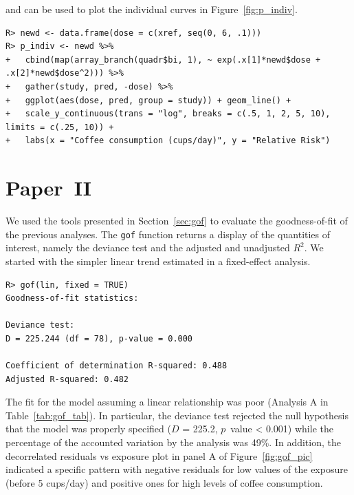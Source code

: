 \documentclass[11pt,a4paper,twoside,openany]{book}\usepackage{knitr}
\begin{document}
{\noindent and can be used to plot the individual curves in Figure~\ref{fig:p_indiv}.
\begin{knitrout}\footnotesize
{}\color{fgcolor}\begin{kframe}
\begin{verbatim}
R> newd <- data.frame(dose = c(xref, seq(0, 6, .1)))
R> p_indiv <- newd %>%
+   cbind(map(array_branch(quadr$bi, 1), ~ exp(.x[1]*newd$dose + .x[2]*newd$dose^2))) %>%
+   gather(study, pred, -dose) %>%
+   ggplot(aes(dose, pred, group = study)) + geom_line() +
+   scale_y_continuous(trans = "log", breaks = c(.5, 1, 2, 5, 10), limits = c(.25, 10)) +
+   labs(x = "Coffee consumption (cups/day)", y = "Relative Risk")
\end{verbatim}
\end{kframe}
\end{knitrout}


\section{Paper~II}\label{sec:res_paperII}



We used the tools presented in Section~\ref{sec:gof} to evaluate the goodness-of-fit of the previous analyses. The \texttt{gof} function returns a display of the quantities of interest, namely the deviance test and the adjusted and unadjusted $R^2$. 
We started with the simpler linear trend estimated in a fixed-effect analysis.
\begin{knitrout}\footnotesize
{}\color{fgcolor}\begin{kframe}
\begin{verbatim}
R> gof(lin, fixed = TRUE)
Goodness-of-fit statistics:

Deviance test: 
D = 225.244 (df = 78), p-value = 0.000

Coefficient of determination R-squared: 0.488 
Adjusted R-squared: 0.482
\end{verbatim}
\end{kframe}
\end{knitrout}

\noindent The fit for the model assuming a linear relationship was poor (Analysis A in Table~\ref{tab:gof_tab}). In particular, the deviance test rejected the null hypothesis that the model was properly specified ($D$ = 225.2, $p$~value < 0.001) while the percentage of the accounted variation by the analysis was 49\%. In addition, the decorrelated residuals vs exposure plot in panel A of Figure~\ref{fig:gof_pic} indicated a specific pattern with negative residuals for low values of the exposure (before 5 cups/day) and positive ones for high levels of coffee consumption.

}
\end{document}
